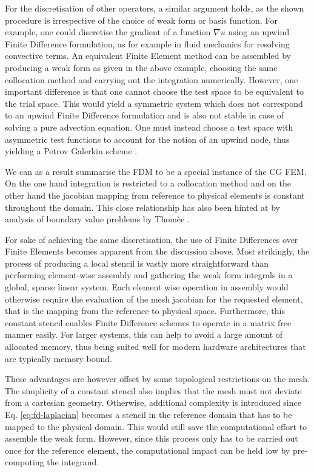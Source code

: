 \documentclass[sn-mathphys,Numbered]{sn-jnl}%
\theoremstyle{thmstyleone}%
\theoremstyle{thmstyletwo}%
\theoremstyle{thmstylethree}%
\begin{document}
For the discretisation of other operators, a similar argument holds, as the shown procedure is irrespective of the choice of weak form or basis function.
For example, one could discretise the gradient of a function $\nabla u$ using an upwind Finite Difference formulation, as for example in fluid mechanics for resolving convective terms.
An equivalent Finite Element method can be assembled by producing a weak form as given in the above example, choosing the same collocation method and carrying out the integration numerically.
However, one important difference is that one cannot choose the test space to be equivalent to the trial space.
This would yield a symmetric system which does not correspond to an upwind Finite Difference formulation and is also not stable in case of solving a pure advection equation.
One must instead choose a test space with asymmetric test functions to account for the notion of an upwind node, thus yielding a Petrov Galerkin scheme \cite{brooksStreamlineUpwindPetrovGalerkin1982}.

We can as a result summarise the FDM to be a special instance of the CG FEM.
On the one hand integration is restricted to a collocation method and on the other hand the jacobian mapping from reference to physical elements is constant throughout the domain.
This close relationship has also been hinted at by analysis of boundary value problems by Thomèe \cite{thomeeFiniteDifferenceFinite1984}.

For sake of achieving the same discretisation, the use of Finite Differences over Finite Elements becomes apparent from the discussion above.
Most strikingly, the process of producing a local stencil is vastly more straightforward than performing element-wise assembly and gathering the weak form integrals in a global, sparse linear system.
Each element wise operation in assembly would otherwise require the evaluation of the mesh jacobian for the requested element, that is the mapping from the reference to physical space.
Furthermore, this constant stencil enables Finite Difference schemes to operate in a matrix free manner easily.
For larger systems, this can help to avoid a large amount of allocated memory, thus being suited well for modern hardware architectures that are typically memory bound.

These advantages are however offset by some topological restrictions on the mesh.
The simplicity of a constant stencil also implies that the mesh must not deviate from a cartesian geometry.
Otherwise, additional complexity is introduced since Eq. \ref{eq:fd-laplacian} becomes a stencil in the reference domain that has to be mapped to the physical domain.
This would still save the computational effort to assemble the weak form.
However, since this process only has to be carried out once for the reference element, the computational impact can be held low by pre-computing the integrand.
\end{document}
